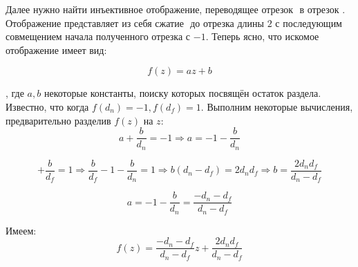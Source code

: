    Далее нужно найти инъективное отображение, переводящее отрезок \begin{math}[d_n, d_f]\end{math} в отрезок \begin{math}[-1, 1]\end{math}. 
   Отображение представляет из себя сжатие \begin{math}[d_n, d_f]\end{math} до отрезка длины \begin{math}2\end{math} с последующим совмещением начала полученного отрезка с \begin{math}-1\end{math}. Теперь ясно, что искомое отображение имеет вид:

   \begin{equation}f(z) = az + b\end{equation}

   , где \begin{math}a, b\end{math} некоторые константы, поиску которых посвящён остаток раздела.
   Известно, что когда \begin{math}f(d_n) = -1, f(d_f) = 1\end{math}. Выполним некоторые вычисления, предварительно разделив 
   \begin{math}f(z)\end{math} на \begin{math}z\end{math}:
   \begin{equation}a + \frac{b}{d_n} = -1 \Rightarrow a = -1 -\frac{b}{d_n} \end{equation}
                                                                             
  
\begin{equation} + \frac{b}{d_f} = 1 \Rightarrow \frac{b}{d_f} - 1 - \frac{b}{d_n} = 1 \Rightarrow b(d_n - d_f) = 2d_n d_f \Rightarrow b = \frac{2d_n d_f}{d_n - d_f}\end{equation}

   \begin{equation}a = -1 - \frac{b}{d_n}  = \frac{-d_n - d_f}{d_n - d_f} \end{equation}

   Имеем:
   \begin{equation}f(z) = \frac{-d_n - d_f}{d_n - d_f}z + \frac{2d_n d_f}{d_n - d_f}\end{equation}



